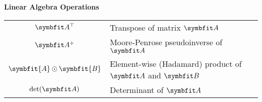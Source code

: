\begin{minipage}{\textwidth}
\centerline{\bf Linear Algebra Operations}
\bgroup
\def\arraystretch{1.5}
\begin{tabular}{cp{5in}}
\centering
$\mA^\top$ & Transpose of matrix $\mA$ \\
$\mA^+$ & Moore-Penrose pseudoinverse of $\mA$\\
$\symbfit{A} \odot \symbfit{B}$ & Element-wise (Hadamard) product of $\mA$ and $\mB$ \\
$\displaystyle \mathrm{det}(\mA)$ & Determinant of $\mA$ \\
\end{tabular}
\egroup
{}
\end{minipage}